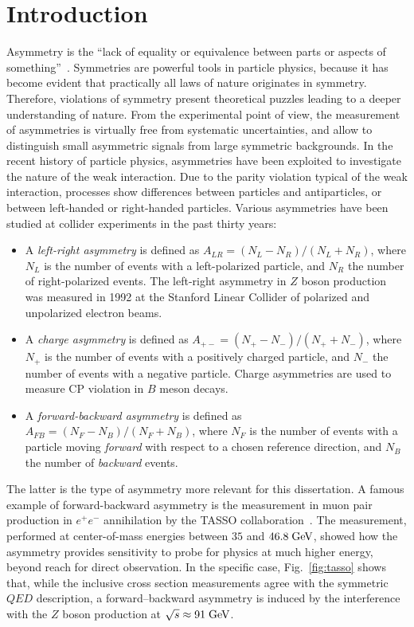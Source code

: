 \chapter{Introduction}
\label{sec:introduction}

Asymmetry is the ``lack of equality or equivalence between parts or
aspects of something''~\cite{oxforddict}.
Symmetries are powerful tools in particle physics, because it has
become evident that practically all laws of nature originates in
symmetry. Therefore, violations of symmetry present theoretical
puzzles leading to a deeper understanding of nature. From the
experimental point of view, the measurement of asymmetries is
virtually free from systematic uncertainties, and allow to distinguish
small asymmetric signals from large symmetric backgrounds.
In the recent history of particle physics, asymmetries have been
exploited to investigate the nature of the weak interaction. 
Due to the parity violation typical of the weak
interaction, processes show differences between particles and
antiparticles, or between left-handed or right-handed particles.
Various asymmetries have been studied at collider experiments in the
past thirty years:

\begin{itemize}
\item A {\it left-right asymmetry} is defined as $A_{LR}=(N_L -
  N_R)/(N_L +N_R)$, where $N_L$ is the number of events with a
  left-polarized particle, and $N_R$ the number of right-polarized
  events. The left-right asymmetry in $Z$ boson production was
  measured in 1992 at the Stanford Linear Collider of polarized and
  unpolarized electron beams\cite{Elia:1993ka}.
\item A {\it charge asymmetry}  is defined as $A_{+-}=(N_+ -
  N_-)/(N_+ +N_-)$, where $N_+$ is the number of events with a
  positively charged particle, and $N_-$ the number of events with a
  negative particle. Charge asymmetries are used to measure CP
  violation in $B$ meson decays.
\item A {\it forward-backward asymmetry} is defined as $A_{FB}=(N_F -
  N_B)/(N_F +N_B)$, where $N_F$ is the number of events with a
  particle moving {\it forward} with respect to a chosen reference
  direction, and $N_B$ the number of {\it backward} events.
\end{itemize}

The latter is the type of asymmetry more relevant for this
dissertation. A famous example of forward-backward asymmetry is the
measurement in muon pair production in $e^+e^-$ annihilation by the
TASSO collaboration~\cite{Braunschweig:1988fy}. The measurement,
performed at center-of-mass energies between $35$ and $46.8\; \mathrm{GeV}{}$,
showed how the asymmetry provides sensitivity to probe for physics at
much higher energy, beyond reach for direct observation. In the
specific case, Fig.~\ref{fig:tasso} shows that, while the inclusive
cross section measurements agree with the symmetric $QED$ description,
a forward--backward asymmetry is induced by the interference with the
$Z$ boson production at $\sqrt{s}\approx 91\; \mathrm{GeV}{}$.

